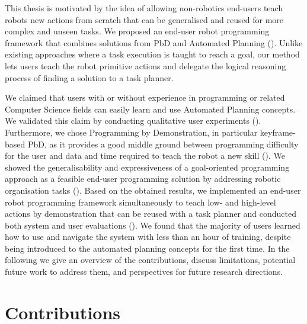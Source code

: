 This thesis is motivated by the idea of allowing non-robotics end-users teach robots new actions from scratch that can be generalised and reused for more complex and unseen tasks.
We proposed an end-user robot programming framework that combines solutions from PbD and Automated Planning ().
Unlike existing approaches where a task execution is taught to reach a goal, our method lets users teach the robot primitive actions and delegate the logical reasoning process of finding a solution to a task planner.

We claimed that users with or without experience in programming or related Computer Science fields can easily learn and use Automated Planning concepts.
We validated this claim by conducting qualitative user experiments ().
Furthermore, we chose Programming by Demonstration, in particular keyframe-based PbD, as it provides a good middle ground between programming difficulty for the user and data and time required to teach the robot a new skill ().
We showed the generalisability and expressiveness of a goal-oriented programming approach as a feasible end-user programming solution by addressing robotic organisation tasks ().
Based on the obtained results, we implemented an end-user robot programming framework simultaneously to teach low- and high-level actions by demonstration that can be reused with a task planner and conducted both system and user evaluations ().
We found that the majority of users learned how to use and navigate the system with less than an hour of training, despite being introduced to the automated planning concepts for the first time.
In the following we give an overview of the contributions, discuss limitations, potential future work to address them, and perspectives for future research directions.

\section{Contributions}
\label{sec:contributions}

